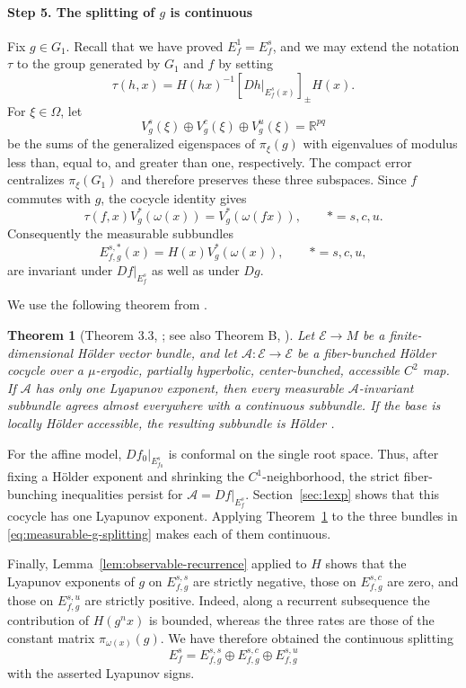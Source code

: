 \documentclass[11pt]{amsart}
\numberwithin{equation}{section}
\theoremstyle{plain}
\newtheorem{thm}{Theorem}[section]
\begin{document}
\paragraph{\textbf{Step 5. The splitting of $g$ is continuous}}


Fix $g\in G_1$.  Recall that we have proved  $E_f^1=E_f^s$, and we may extend the
notation $\tau$ to the group generated by $G_1$ and $f$ by setting
\[
\tau(h,x)=H(hx)^{-1}[Dh|_{E_f^s(x)}]_{\pm}H(x).
\]
For $\xi\in\Omega$, let
\[
V_g^s(\xi)\oplus V_g^c(\xi)\oplus V_g^u(\xi)=\mathbb R^{pq}
\]
be the sums of the generalized eigenspaces of $\pi_\xi(g)$ with
eigenvalues of modulus less than, equal to, and greater than one,
respectively.  The compact error centralizes $\pi_\xi(G_1)$ and
therefore preserves these three subspaces.  Since $f$ commutes with
$g$, the cocycle identity gives
\[
\tau(f,x)V_g^\ast(\omega(x))=V_g^\ast(\omega(fx)),
\qquad \ast=s,c,u.
\]
Consequently the measurable subbundles
\begin{equation}\label{eq:measurable-g-splitting}
E^{s,\ast}_{f,g}(x)=H(x)V_g^\ast(\omega(x)),
\qquad \ast=s,c,u,
\end{equation}
are invariant under $Df|_{E_f^s}$ as well as under $Dg$.

We use the following theorem from \cite{KalSad1exp}.

\begin{thm}[Theorem 3.3, \cite{KalSad1exp}; see also Theorem B,
\cite{ASV}]\label{contbund1exp}
Let $\mathcal E\to M$ be a finite-dimensional H\"older vector bundle,
and let $\mathcal A:\mathcal E\to\mathcal E$ be a fiber-bunched
H\"older cocycle over a $\mu$-ergodic, partially hyperbolic,
center-bunched, accessible $C^2$ map.  If $\mathcal A$ has only one
Lyapunov exponent, then every measurable $\mathcal A$-invariant
subbundle agrees almost everywhere with a continuous subbundle.  If the
base is locally H\"older accessible, the resulting subbundle is H\"older
\cite[Corollary~3.7]{KalSad1exp}.
\end{thm}

For the affine model, $Df_0|_{E_{f_0}^s}$ is conformal on the single root
space.  Thus, after fixing a H\"older exponent and shrinking the
$C^1$-neighborhood, the strict fiber-bunching inequalities persist for
$\mathcal A=Df|_{E_f^s}$.  Section~\ref{sec:1exp} shows that this
cocycle has one Lyapunov exponent.  Applying
Theorem~\ref{contbund1exp} to the three bundles in
\eqref{eq:measurable-g-splitting} makes each of them continuous.

Finally, Lemma~\ref{lem:observable-recurrence} applied to $H$ shows that the Lyapunov
exponents of $g$ on $E^{s,s}_{f,g}$ are strictly negative, those on
$E^{s,c}_{f,g}$ are zero, and those on $E^{s,u}_{f,g}$ are strictly
positive.  Indeed, along a recurrent subsequence the contribution of
$H(g^nx)$ is bounded, whereas the three rates are those of the
constant matrix $\pi_{\omega(x)}(g)$.  We have therefore obtained the
continuous splitting
\[
E_f^s=E^{s,s}_{f,g}\oplus E^{s,c}_{f,g}\oplus E^{s,u}_{f,g}
\]
with the asserted Lyapunov signs.
\end{document}
